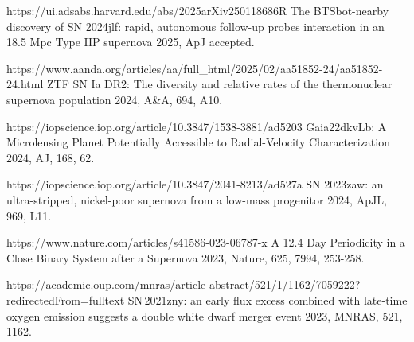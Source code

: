 \begin{cvpubs}
{\begin{cvitems}
    {\Cliu}
    {https://ui.adsabs.harvard.edu/abs/2025arXiv250118686R}
    {The BTSbot-nearby discovery of SN 2024jlf: rapid, autonomous follow-up probes interaction in an 18.5 Mpc Type IIP supernova}
    {2025, ApJ accepted.}
    \item {}
    {\Cliu}
    {https://www.aanda.org/articles/aa/full_html/2025/02/aa51852-24/aa51852-24.html}
    {ZTF SN Ia DR2: The diversity and relative rates of the thermonuclear supernova population}
    {2024, A\&A, 694, A10.}
    \item {} 
    {\Cliu}
    {https://iopscience.iop.org/article/10.3847/1538-3881/ad5203}
    {Gaia22dkvLb: A Microlensing Planet Potentially Accessible to Radial-Velocity Characterization}
    {2024, AJ, 168, 62.}
    \item {} 
    {\Cliu}
    {https://iopscience.iop.org/article/10.3847/2041-8213/ad527a}
    {SN 2023zaw: an ultra-stripped, nickel-poor supernova from a low-mass progenitor}
    {2024, ApJL, 969, L11.}
    \item {} 
    {\Cliu}
    {https://www.nature.com/articles/s41586-023-06787-x}
    {A 12.4 Day Periodicity in a Close Binary System after a Supernova}
    {2023, Nature, 625, 7994, 253-258.}
    \item {} 
    {\Cliu}
    {https://academic.oup.com/mnras/article-abstract/521/1/1162/7059222?redirectedFrom=fulltext}
    {SN\,2021zny: an early flux excess combined with late-time oxygen emission suggests a double white dwarf merger event}
    {2023, MNRAS, 521, 1162.}
\end{cvitems}
}


\end{cvpubs}





